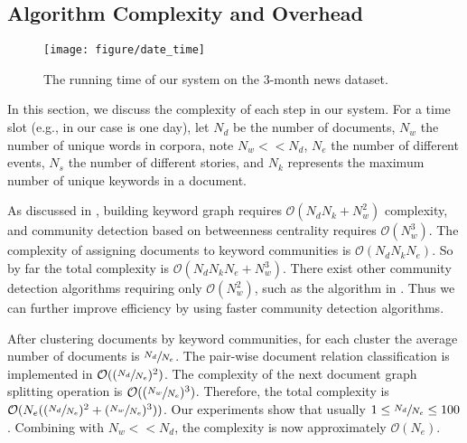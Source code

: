 \subsection{Algorithm Complexity and Overhead}
\label{subsec:complexity}

\begin{figure}[t]
		\hspace{7mm}
        \texttt{[image: figure/date\_time]}
        \vspace{-5mm}
        \caption{The running time of our system on the 3-month	 news dataset.}
        \label{fig:timeComplexity}
        \vspace{-5mm}
\end{figure}

In this section,  we discuss the complexity of each step in our system. For a time slot (e.g., in our case is one day), let $N_d$ be the number of documents, $N_w$ the number of unique words in corpora, note $N_w << N_d$, $N_e$ the number of different events, $N_s$ the number of different stories, and $N_k$ represents the maximum number of unique keywords in a document. 

As discussed in \cite{sayyadi2013graph}, building keyword graph requires $\mathcal{O}(N_d N_k + N_w^2)$ complexity, and community detection based on betweenness centrality requires $\mathcal{O}(N_w^3)$. The complexity of assigning documents to keyword communities is $\mathcal{O}(N_d N_k  N_e)$. So by far the total complexity is $\mathcal{O}(N_dN_k N_e + N_w^3)$. There exist other community detection algorithms requiring only $\mathcal{O}(N_w^2)$, such as the algorithm in \cite{radicchi2004defining}. Thus we can further improve efficiency by using faster community detection algorithms.

After clustering documents by keyword communities, for each cluster the average number of documents is $\sfrac{N_d}{N_e}$. The pair-wise document relation classification is implemented in $\mathcal{O}((\sfrac{N_d}{N_e})^2)$. The complexity of the next document graph splitting operation is $\mathcal{O}((\sfrac{N_w}{N_e})^3)$. Therefore, the total complexity is $\mathcal{O}(N_e((\sfrac{N_d}{N_e})^2 + (\sfrac{N_w}{N_e})^3))$. Our experiments show that usually $1 \leq \sfrac{N_d}{N_e} \leq 100$. Combining with $N_w << N_d$, the complexity is now approximately $\mathcal{O}(N_e)$.

